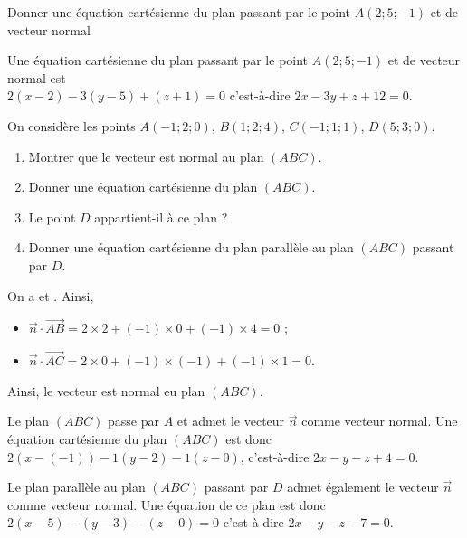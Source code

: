 \documentclass[11pt,fleqn, openany]{book} %
\begin{document}
\begin{exercise}Donner une équation cartésienne du plan passant par le point $A(2;5;-1)$ et de vecteur normal \end{exercise}

\begin{solution}Une équation cartésienne du plan passant par le point $A(2;5;-1)$ et de vecteur normal  est \\ $ 2(x-2)-3(y-5)+(z+1)=0$ c'est-à-dire $2x-3y+z+12=0$.\end{solution}



\begin{exercise} On considère les points $A(-1;2;0)$, $B(1;2;4)$, $C(-1;1;1)$, $D(5;3;0)$.

\begin{enumerate}
\item Montrer que le vecteur  est normal au plan $(ABC)$.
\item Donner une équation cartésienne du plan $(ABC)$.
\item Le point $D$ appartient-il à ce plan ?
\item Donner une équation cartésienne du plan parallèle au plan $(ABC)$ passant par $D$.
\end{enumerate}\end{exercise}

\begin{solution}On a  et . Ainsi,
\begin{itemize}
\item $\vec n \cdot \overrightarrow{AB}=2\times 2 +(-1) \times 0 + (-1) \times 4 = 0$ ;
\item $\vec n \cdot \overrightarrow{AC}=2\times 0 + (-1) \times (-1) + (-1) \times 1 = 0$.
\end{itemize}
Ainsi, le vecteur  est normal eu plan $(ABC)$.

Le plan $(ABC)$ passe par $A$ et admet le vecteur $\vec n$ comme vecteur normal. Une équation cartésienne du plan $(ABC)$ est donc $2(x-(-1))-1(y-2)-1(z-0)$, c'est-à-dire $2x-y-z+4=0$.

Le plan parallèle au plan $(ABC)$ passant par $D$ admet également le vecteur $\vec n$ comme vecteur normal. Une équation de ce plan est donc $2(x-5)-(y-3)-(z-0)=0$
c'est-à-dire $2x-y-z-7=0$.\end{solution}
\end{document}

